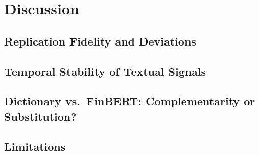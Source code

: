 \documentclass[12pt,a4paper,oneside]{report}
\begin{document}
\chapter{Discussion}
\label{ch:discussion}

\section{Replication Fidelity and Deviations}
\label{sec:replication_fidelity}

\section{Temporal Stability of Textual Signals}
\label{sec:temporal_stability}

\section{Dictionary vs.\ FinBERT: Complementarity or Substitution?}
\label{sec:dict_vs_finbert}

\section{Limitations}
\label{sec:limitations}
\end{document}
